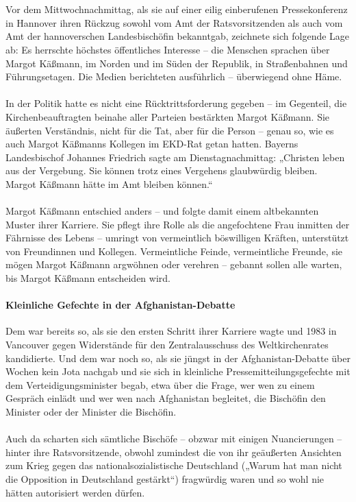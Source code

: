 \documentclass[a4paper,12pt,oneside]{scrbook}
\begin{document}
\\\\
Vor dem Mittwochnachmittag, als sie auf einer eilig einberufenen Pressekonferenz in Hannover ihren Rückzug sowohl vom Amt der Ratsvorsitzenden als auch vom Amt der hannoverschen Landesbischöfin bekanntgab, zeichnete sich folgende Lage ab: Es herrschte höchstes öffentliches Interesse – die Menschen sprachen über Margot Käßmann, im Norden und im Süden der Republik, in Straßenbahnen und Führungsetagen. Die Medien berichteten ausführlich – überwiegend ohne Häme.
\\\\
In der Politik hatte es nicht eine Rücktrittsforderung gegeben – im Gegenteil, die Kirchenbeauftragten beinahe aller Parteien bestärkten Margot Käßmann. Sie äußerten Verständnis, nicht für die Tat, aber für die Person – genau so, wie es auch Margot Käßmanns Kollegen im EKD-Rat getan hatten. Bayerns Landesbischof Johannes Friedrich sagte am Dienstagnachmittag: „Christen leben aus der Vergebung. Sie können trotz eines Vergehens glaubwürdig bleiben. Margot Käßmann hätte im Amt bleiben können.“
\\\\
Margot Käßmann entschied anders – und folgte damit einem altbekannten Muster ihrer Karriere. Sie pflegt ihre Rolle als die angefochtene Frau inmitten der Fährnisse des Lebens – umringt von vermeintlich böswilligen Kräften, unterstützt von Freundinnen und Kollegen. Vermeintliche Feinde, vermeintliche Freunde, sie mögen Margot Käßmann argwöhnen oder verehren – gebannt sollen alle warten, bis Margot Käßmann entscheiden wird.
\paragraph{Kleinliche Gefechte in der Afghanistan-Debatte}
Dem war bereits so, als sie den ersten Schritt ihrer Karriere wagte und 1983 in Vancouver gegen Widerstände für den Zentralausschuss des Weltkirchenrates kandidierte. Und dem war noch so, als sie jüngst in der Afghanistan-Debatte über Wochen kein Jota nachgab und sie sich in kleinliche Pressemitteilungsgefechte mit dem Verteidigungsminister begab, etwa über die Frage, wer wen zu einem Gespräch einlädt und wer wen nach Afghanistan begleitet, die Bischöfin den Minister oder der Minister die Bischöfin.
\\\\
Auch da scharten sich sämtliche Bischöfe – obzwar mit einigen Nuancierungen – hinter ihre Ratsvorsitzende, obwohl zumindest die von ihr geäußerten Ansichten zum Krieg gegen das nationalsozialistische Deutschland („Warum hat man nicht die Opposition in Deutschland gestärkt“) fragwürdig waren und so wohl nie hätten autorisiert werden dürfen.
\end{document}
